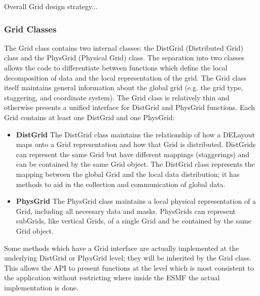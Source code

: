 

Overall Grid design strategy...

\subsubsection{Grid Classes}
The Grid class contains two internal classes: the DistGrid (Distributed
Grid) class and the PhysGrid (Physical Grid) class.  The separation into two
classes allows the code to differentiate between functions which define the
local decomposition of data and the local representation of the grid.  The Grid
class itself maintains general information about the global grid (e.g. the
grid type, staggering, and coordinate system).  The Grid class is relatively
thin and otherwise presents a unified interface for DistGrid and PhysGrid
functions.  Each Grid contains at least one DistGrid and one PhysGrid:
\begin{itemize}
\item {\bf DistGrid} The DistGrid class maintains the relationship of how
a DELayout maps onto a Grid representation and how that Grid is distributed.
DistGrids can represent the same Grid but have different mappings (staggerings)
and can be contained by the same Grid object. The DistGrid class represents the
mapping between the global Grid and the local data distribution;  it has
methods to aid in the collection and communication of global data.
\item {\bf PhysGrid} The PhysGrid class maintains a local physical
representation of a Grid, including all necessary data and masks.  PhysGrids
can represent subGrids, like vertical Grids, of a single Grid and be
contained by the same Grid object.
\end{itemize}

Some methods which have a Grid interface are actually implemented
at the underlying DistGrid or PhysGrid level; they will be inherited
by the Grid class.  This allows the API to present functions at the 
level which is most consistent to the application without restricting
where inside the ESMF the actual implementation is done.

